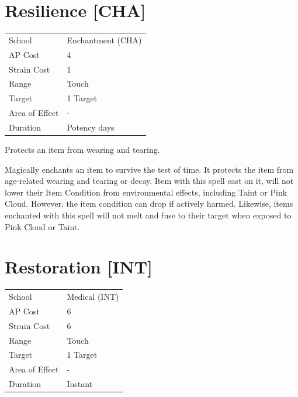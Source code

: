 \documentclass[11pt,a4paper,twocolumn]{book}
\begin{document}
\section*{Resilience [CHA]}
{
	\begin{tabu} to 75mm{| X[l,4] | X[l,7] |}
		\hline
		School 			& Enchantment (CHA) 	\\
        AP Cost	      	& 4 					\\
        Strain Cost     & 1 					\\
        Range     		& Touch					\\
        Target      	& 1 Target				\\
        Area of Effect  & -  	 				\\
        Duration     	& Potency days			\\ \hline
	\end{tabu}
		
}

\medskip

Protects an item from wearing and tearing.

Magically enchants an item to survive the test of time. It protects the item from age-related wearing and tearing or decay. Item with this spell cast on it, will not lower their Item Condition from environmental effects, including Taint or Pink Cloud.  However, the item condition can drop if actively harmed. Likewise, items enchanted with this spell will not melt and fuse to their target when exposed to Pink Cloud or Taint.


\section*{Restoration [INT]}
{
	\begin{tabu} to 75mm{| X[l,4] | X[l,7] |}
		\hline
		School 			& Medical (INT) 		\\
        AP Cost	      	& 6 					\\
        Strain Cost     & 6 					\\
        Range     		& Touch					\\
        Target      	& 1 Target				\\
        Area of Effect  & -  	 				\\
        Duration     	& Instant				\\ \hline
	\end{tabu}
		
}
\end{document}
